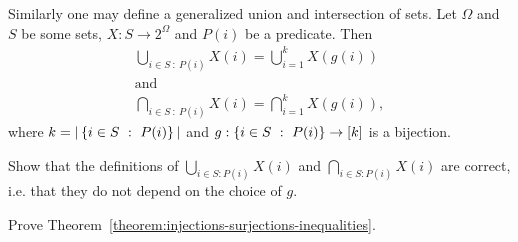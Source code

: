 Similarly one may define a generalized union and intersection of sets.
Let $\Omega$ and $S$ be some sets, $X : S \to 2^\Omega$ and $P(i)$ be a
predicate. Then
\begin{gather*}
    \bigcup_{i \in S ~:~ P(i)} X(i) = \bigcup_{i = 1}^k X(g(i)) \\
    \text{and}\\
    \bigcap_{i \in S ~:~ P(i)} X(i) = \bigcap_{i = 1}^k X(g(i)),
\end{gather*}
where $k = |\set[P(i)]{i \in S}|$ and $g : \set[P(i)]{i \in S} \to \range{k}$ is
a bijection.

\begin{exercise}
    Show that the definitions of $\bigcup_{i \in S : P(i)} X(i)$ and
    $\bigcap_{i \in S : P(i)} X(i)$ are correct,
    i.e. that they do not depend on the choice of $g$.
\end{exercise}


\begin{chapterendexercises}
    \exercise Prove Theorem~\ref{theorem:injections-surjections-inequalities}.
\end{chapterendexercises}
